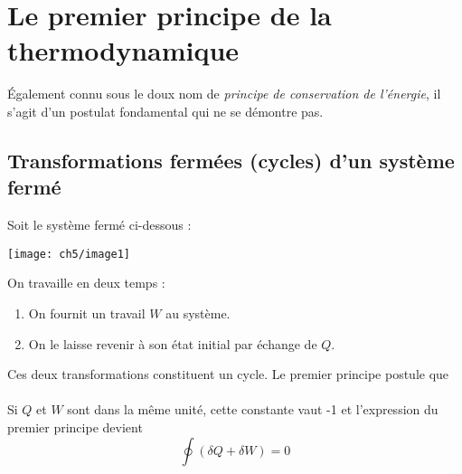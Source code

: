 \chapter{Le premier principe de la thermodynamique} 
Également connu sous le doux nom de \textit{principe de 
conservation de l'énergie}, il s'agit d'un postulat fondamental
qui ne se démontre pas.

\section{Transformations fermées (cycles) d'un système fermé}
Soit le système fermé ci-dessous :
\begin{center}
	\texttt{[image: ch5/image1]}
\end{center}
On travaille en deux temps :
\begin{enumerate}
	\item On fournit un travail $W$ au système.
	\item On le laisse revenir à son état initial par échange de $Q$.
\end{enumerate}
Ces deux transformations constituent un cycle. Le premier principe 
postule que\\

\ \\

Si $Q$ et $W$ sont dans la même unité, cette constante vaut -1 et 
l'expression du premier principe devient
\begin{equation}
	\oint (\delta Q + \delta W) = 0
\end{equation}

